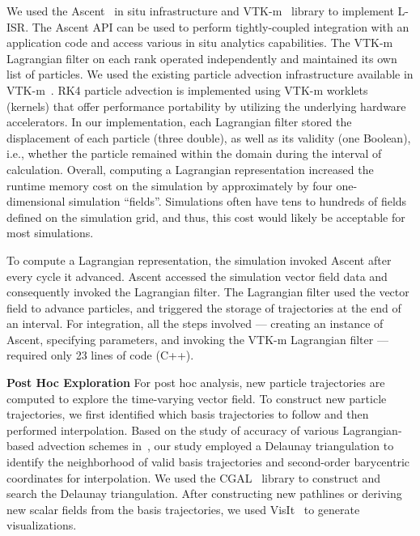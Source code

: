 We used the Ascent~\cite{Larsen2017Alpine} in situ infrastructure and VTK-m~\cite{moreland2016vtk} library to implement L-ISR. 
%
The Ascent API can be used to perform tightly-coupled integration with an application code and access various in situ analytics capabilities.
The VTK-m Lagrangian filter on each rank operated independently and maintained its own list of particles.
%
We used the existing particle advection infrastructure available in VTK-m~\cite{pugmire2018performance}.
%
RK4 particle advection is implemented using VTK-m worklets (kernels) that offer performance portability by utilizing the underlying hardware accelerators.
%
In our implementation, each Lagrangian filter stored the displacement of each particle (three double), as well as its validity (one Boolean), i.e., whether the particle remained within the domain during the interval of calculation.
%
Overall, computing a Lagrangian representation increased the runtime memory cost on the simulation by approximately by four one-dimensional simulation ``fields''.
%
Simulations often have tens to hundreds of fields defined on the simulation grid, and thus, this cost would likely be acceptable for most simulations.
%
%

To compute a Lagrangian representation, the simulation invoked Ascent after every cycle it advanced.
%
Ascent accessed the simulation vector field data and consequently invoked the Lagrangian filter. 
%
The Lagrangian filter used the vector field to advance particles, and triggered the storage of trajectories at the end of an interval.
%
%
For integration, all the steps involved --- creating an instance of Ascent, specifying parameters, and invoking the VTK-m Lagrangian filter --- required only 23 lines of code (C++). %
%
%

\noindent\textbf{Post Hoc Exploration}
For post hoc analysis, new particle trajectories are computed to explore the time-varying vector field. %
%
To construct new particle trajectories, we first identified which basis trajectories to follow and then performed interpolation.
%
Based on the study of accuracy of various Lagrangian-based advection schemes in~\cite{agranovsky2015subsampling}, our study employed a Delaunay triangulation to identify the neighborhood of valid basis trajectories and second-order barycentric coordinates for interpolation.
%
We used the CGAL~\cite{fabri2011cgal} library to construct and search the Delaunay triangulation.
%
After constructing new pathlines or deriving new scalar fields from the basis trajectories, we used VisIt~\cite{childs2012visit} to generate visualizations.

